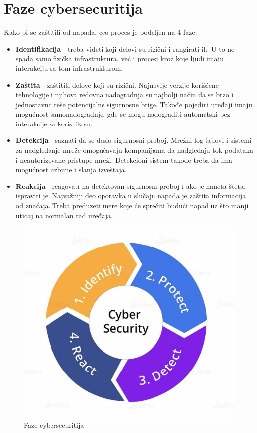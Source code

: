 \documentclass[a4paper]{article}
\begin{document}
{\section{Faze cybersecuritija}
\label{sec:faze}
Kako bi se zaštitili od napada, ceo proces je podeljen na 4 faze: 
\begin{itemize}
\item \textbf{Identifikacija} - treba videti koji delovi su rizični i rangirati ih. U to ne spada samo fizička infrastruktura, već i procesi kroz koje ljudi imaju interakciju sa tom infrastrukturom.
\item \textbf{Zaštita} - zaštititi delove koji su rizični. Najnovije verzije korišćene tehnologije i njihova redovna nadogradnja su najbolji način da se brzo i jednostavno reše potencijalne sigurnosne brige. Takođe pojedini uređaji imaju mogućnost samonadogradnje, gde se mogu nadograditi automatski bez interakcije sa korisnikom.
\item \textbf{Detekcija} - saznati da se desio sigurnosni proboj. Mrežni log fajlovi i sistemi za nadgledanje mreže omogućavaju kompanijama da nadgledaju tok podataka i neautorizovane pristupe mreži. Detekcioni sistem takođe treba da ima mogućnost uzbune i slanja izveštaja. 
\item \textbf{Reakcija} - reagovati na detektovan sigurnosni proboj i ako je naneta šteta, ispraviti je. Najvažniji deo oporavka u slučaju napada je zaštita informacija od značaja. Treba preduzeti mere koje će sprečiti budući napad uz što manji uticaj na normalan rad uređaja.\cite{cyberphases}
\end{itemize} 

\begin{figure}[h!]
	\begin{center}
		\includegraphics[scale=0.2]{faze.jpg}
	\end{center}
	\caption{Faze cybersecuritija}
\end{figure}




}
\end{document}
